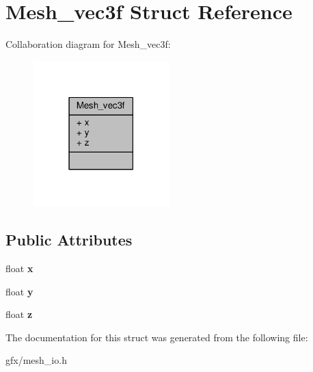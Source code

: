\hypertarget{structMesh__vec3f}{}\section{Mesh\+\_\+vec3f Struct Reference}
\label{structMesh__vec3f}


Collaboration diagram for Mesh\+\_\+vec3f\+:
\nopagebreak
\begin{figure}[H]
\begin{center}
\leavevmode
\includegraphics[width=150pt]{d1/dbd/structMesh__vec3f__coll__graph}
\end{center}
\end{figure}
\subsection*{Public Attributes}
\begin{DoxyCompactItemize}
\item 
float {\bfseries x}\hypertarget{structMesh__vec3f_a9ea59b57790760f4bad51f8a82c7e046}{}\label{structMesh__vec3f_a9ea59b57790760f4bad51f8a82c7e046}

\item 
float {\bfseries y}\hypertarget{structMesh__vec3f_ad00b16e45fc12eee3e386f7c81f113b7}{}\label{structMesh__vec3f_ad00b16e45fc12eee3e386f7c81f113b7}

\item 
float {\bfseries z}\hypertarget{structMesh__vec3f_ae196133d0c6cdcb29deed55fd21516ab}{}\label{structMesh__vec3f_ae196133d0c6cdcb29deed55fd21516ab}

\end{DoxyCompactItemize}


The documentation for this struct was generated from the following file\+:\begin{DoxyCompactItemize}
\item 
gfx/mesh\+\_\+io.\+h\end{DoxyCompactItemize}
